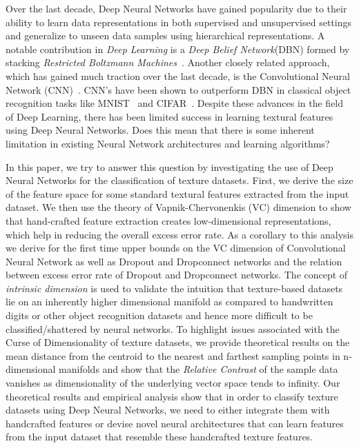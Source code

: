 \documentclass[11pt,a4paper]{article}
\begin{document}
Over the last decade, Deep Neural Networks have gained popularity due to their ability to learn data representations in both supervised and unsupervised settings and generalize to unseen data samples using hierarchical representations. A notable contribution in \emph{Deep Learning} is a \emph{Deep Belief Network}(DBN) formed by stacking \emph{Restricted Boltzmann Machines}~\cite{Hinton06afast}. Another closely related approach, which has gained much traction over the last decade, is the Convolutional Neural Network (CNN)~\cite{Lecun98gradient-basedlearning}. CNN's have been shown to outperform DBN in classical object recognition tasks like MNIST~\cite{mnist} and CIFAR~\cite{Krizhevsky09learningmultiple}. Despite these advances in the field of Deep Learning, there has been limited success in learning textural features using Deep Neural Networks. Does this mean that there is some inherent limitation in existing Neural Network architectures and learning algorithms? 

In this paper, we try to answer this question by investigating the use of Deep Neural Networks for the classification of texture datasets. First, we derive the size of the feature space for some standard textural features extracted from the input dataset. We then use the theory of Vapnik-Chervonenkis (VC) dimension to show that hand-crafted feature extraction creates low-dimensional representations, which help in reducing the overall excess error rate. As a corollary to this analysis we derive for the first time upper bounds on the VC dimension of Convolutional Neural Network as well as Dropout and Dropconnect networks and the relation between excess error rate of Dropout and Dropconnect networks. The concept of \emph{intrinsic dimension} is used to validate the intuition that texture-based datasets lie on an inherently higher dimensional manifold as compared to handwritten digits or other object recognition datasets and hence more difficult to be classified/shattered by neural networks. To highlight issues associated with the Curse of Dimensionality of texture datasets, we provide theoretical results on the mean distance from the centroid to the nearest and farthest sampling points in n-dimensional manifolds and show that the \emph{Relative Contrast} of the sample data vanishes as dimensionality of the underlying vector space tends to infinity. Our theoretical results and empirical analysis show that in order to classify texture datasets using Deep Neural Networks, we need to either integrate them with handcrafted features or devise novel neural architectures that can learn features from the input dataset that resemble these handcrafted texture features.  
\end{document}
